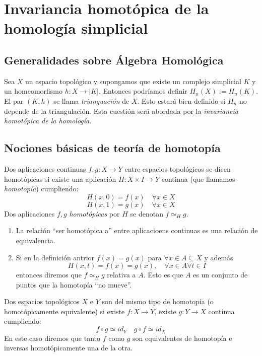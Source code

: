 \documentclass[HS.tex]{subfiles}
\begin{document}
\chapter{Invariancia homotópica de la homología simplicial}

\section{Generalidades sobre Álgebra Homológica}
Sea $X$ un espacio topológico y supongamos que existe un complejo simplicial $K$ y un homeomorfismo $h \colon X \to |K|$.
Entonces podríamos definir $H_n(X) := H_n(K)$.
El par $(K,h)$ se llama \emph{trianguación} de $X$.
Esto estará bien definido si $H_n$ no depende de la triangulación.
Esta cuestión será abordada por la \emph{invariancia homotópica de la homología}.

\section{Nociones básicas de teoría de homotopía}
\begin{defi}
Dos aplicaciones continuas $f,g \colon X \to Y$ entre espacios topológicos se dicen homotópicas si existe una aplicación $H \colon X \times I \to Y$ continua (que llamamos \emph{homotopía}) cumpliendo:
\[ H(x,0) = f(x) \quad \forall x \in X \]
\[ H(x,1) = g(x) \quad \forall x \in X \]
Dos aplicaciones $f,g$ \emph{homotópicas} por $H$ se denotan $f \simeq_H g$.
\end{defi}

\begin{prop}\mbox{}
\begin{enumerate}
\item La relación ``ser homotópica a'' entre aplicacioens continuas es una relación de equivalencia.
\item Si en la definición antrior $f(x) = g(x)$ para $\forall x \in A \subseteq X$ y además
\[ H(x,t) = f(x) = g(x),\quad \forall x \in A \forall t \in I \]
entonces diremos que $f \simeq_H g$ relativa a $A$.
Esto es que $A$ es un conjunto de puntos que la homotopía ``no mueve''.
\end{enumerate}
\end{prop}

\begin{defi}
Dos espacios topológicos $X$ e $Y$ son del mismo tipo de homotopía (o homotópicamente equivalente) si existe $f \colon X \to Y$, existe $g \colon Y \to X$ continua cumpliendo:
\[ f \circ g \simeq id_Y \quad g \circ f \simeq id_X \]
En este caso diremos que tanto $f$ como $g$ son equivalentes de homotopía e inversas homotópicamente una de la otra.
\end{defi}
\end{document}

